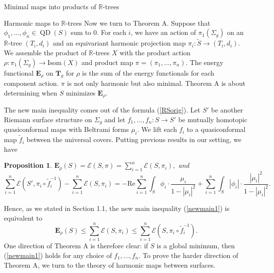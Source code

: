 \documentclass[10pt]{amsart}
\newcommand{\R}{\mathbb R}
\newtheorem{prop}[thm]{Proposition}
\DeclareMathOperator{\QD}{\textrm{QD}}
\theoremstyle{definition}
\begin{document}
\begin{section}{Minimal maps into products of $\R$-trees}
\begin{subsection}{Harmonic maps to $\R$-trees}
Now we turn to Theorem A. Suppose that $\phi_1,\dots, \phi_n\in \QD(S)$ sum to $0$. For each $i$, we have an action of $\pi_1(\Sigma_g)$ on an $\R$-tree $(T_i,d_i)$ and an equivariant harmonic projection map $\pi_i:\tilde{S}\to (T_i,d_i)$. We assemble the product of $\R$-trees $X$ with the product action $\rho:\pi_1(\Sigma_g)\to\textrm{Isom}(X)$ and product map $\pi=(\pi_1,\dots,\pi_n).$ The energy functional $\mathbf{E}_\rho$ on $\mathbf{T}_g$ for $\rho$ is the sum of the energy functionals for each component action. $\pi$ is not only harmonic but also minimal. Theorem A is about determining when $S$ minimizes $\mathbf{E}_\rho.$

The new main inequality comes out of the formula (\ref{RSorig}). Let $S'$ be another Riemann surface structure on $\Sigma_g$ and let $f_1,\dots, f_n: S\to S'$ be mutually homotopic quasiconformal maps with Beltrami forms $\mu_i$. We lift each $f_i$ to a quasiconformal map $\tilde{f}_i$ between the universal covers. Putting previous results in our setting, we have
\begin{prop}\label{RStree}
$\mathbf{E}_\rho(S)=\mathcal{E}(S,\pi)=\sum_{i=1}^n\mathcal{E}(S,\pi_i),$ and
$$\sum_{i=1}^n\mathcal{E}(S',\pi_i\circ \tilde{f}_i^{-1}) -\sum_{i=1}^n\mathcal{E}(S,\pi_i) =  -\textrm{Re} \sum_{i=1}^n\int_S \phi_i\cdot \frac{ \mu_i}{1-|\mu_i|^2} + \sum_{i=1}^n\int_S |\phi_i|\cdot \frac{|\mu_i|^2}{1-|\mu_i|^2}.$$
\end{prop}
Hence, as we stated in Section 1.1, the new main inequality (\ref{newmain1}) is equivalent to $$\mathbf{E}_\rho(S)\leq \sum_{i=1}^n \mathcal{E}(S,\pi_i) \leq \sum_{i=1}^n \mathcal{E}(S,\pi_i\circ \tilde{f}_i^{-1}).$$
One direction of Theorem A is therefore clear: if $S$ is a global minimum, then (\ref{newmain1}) holds for any choice of $f_1,\dots, f_n.$ To prove the harder direction of Theorem A, we turn to the theory of harmonic maps between surfaces.
\end{subsection}


\end{section}
\end{document}
